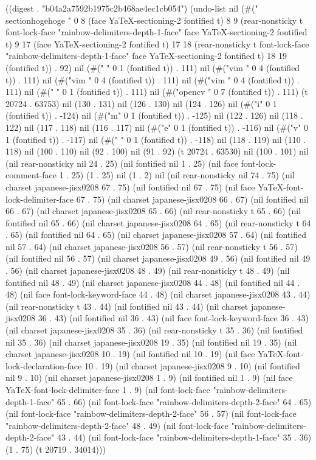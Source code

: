 
((digest . "b04a2a7592b1975c2b468ae4ec1cb054") (undo-list nil (#("\\section{hogehoge}
" 0 8 (face YaTeX-sectioning-2 fontified t) 8 9 (rear-nonsticky t font-lock-face "rainbow-delimiters-depth-1-face" face YaTeX-sectioning-2 fontified t) 9 17 (face YaTeX-sectioning-2 fontified t) 17 18 (rear-nonsticky t font-lock-face "rainbow-delimiters-depth-1-face" face YaTeX-sectioning-2 fontified t) 18 19 (fontified t)) . 92) nil (#("
" 0 1 (fontified t)) . 111) nil (#("vim
" 0 4 (fontified t)) . 111) nil (#("vim
" 0 4 (fontified t)) . 111) nil (#("vim
" 0 4 (fontified t)) . 111) nil (#("
" 0 1 (fontified t)) . 111) nil (#("opencv
" 0 7 (fontified t)) . 111) (t 20724 . 63753) nil (130 . 131) nil (126 . 130) nil (124 . 126) nil (#("i" 0 1 (fontified t)) . -124) nil (#("m" 0 1 (fontified t)) . -125) nil (122 . 126) nil (118 . 122) nil (117 . 118) nil (116 . 117) nil (#("e" 0 1 (fontified t)) . -116) nil (#("v" 0 1 (fontified t)) . -117) nil (#("
" 0 1 (fontified t)) . -118) nil (118 . 119) nil (110 . 118) nil (100 . 110) nil (92 . 100) nil (91 . 92) (t 20724 . 63530) nil (100 . 101) nil (nil rear-nonsticky nil 24 . 25) (nil fontified nil 1 . 25) (nil face font-lock-comment-face 1 . 25) (1 . 25) nil (1 . 2) nil (nil rear-nonsticky nil 74 . 75) (nil charset japanese-jisx0208 67 . 75) (nil fontified nil 67 . 75) (nil face YaTeX-font-lock-delimiter-face 67 . 75) (nil charset japanese-jisx0208 66 . 67) (nil fontified nil 66 . 67) (nil charset japanese-jisx0208 65 . 66) (nil rear-nonsticky t 65 . 66) (nil fontified nil 65 . 66) (nil charset japanese-jisx0208 64 . 65) (nil rear-nonsticky t 64 . 65) (nil fontified nil 64 . 65) (nil charset japanese-jisx0208 57 . 64) (nil fontified nil 57 . 64) (nil charset japanese-jisx0208 56 . 57) (nil rear-nonsticky t 56 . 57) (nil fontified nil 56 . 57) (nil charset japanese-jisx0208 49 . 56) (nil fontified nil 49 . 56) (nil charset japanese-jisx0208 48 . 49) (nil rear-nonsticky t 48 . 49) (nil fontified nil 48 . 49) (nil charset japanese-jisx0208 44 . 48) (nil fontified nil 44 . 48) (nil face font-lock-keyword-face 44 . 48) (nil charset japanese-jisx0208 43 . 44) (nil rear-nonsticky t 43 . 44) (nil fontified nil 43 . 44) (nil charset japanese-jisx0208 36 . 43) (nil fontified nil 36 . 43) (nil face font-lock-keyword-face 36 . 43) (nil charset japanese-jisx0208 35 . 36) (nil rear-nonsticky t 35 . 36) (nil fontified nil 35 . 36) (nil charset japanese-jisx0208 19 . 35) (nil fontified nil 19 . 35) (nil charset japanese-jisx0208 10 . 19) (nil fontified nil 10 . 19) (nil face YaTeX-font-lock-declaration-face 10 . 19) (nil charset japanese-jisx0208 9 . 10) (nil fontified nil 9 . 10) (nil charset japanese-jisx0208 1 . 9) (nil fontified nil 1 . 9) (nil face YaTeX-font-lock-delimiter-face 1 . 9) (nil font-lock-face "rainbow-delimiters-depth-1-face" 65 . 66) (nil font-lock-face "rainbow-delimiters-depth-2-face" 64 . 65) (nil font-lock-face "rainbow-delimiters-depth-2-face" 56 . 57) (nil font-lock-face "rainbow-delimiters-depth-2-face" 48 . 49) (nil font-lock-face "rainbow-delimiters-depth-2-face" 43 . 44) (nil font-lock-face "rainbow-delimiters-depth-1-face" 35 . 36) (1 . 75) (t 20719 . 34014)))
